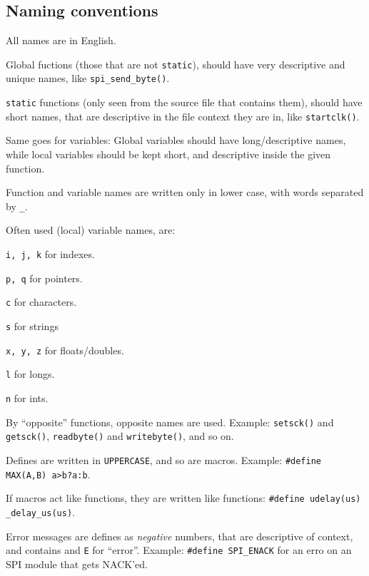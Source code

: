 \documentclass[article, 10pt]{memoir}
\let\tempone\itemize
\let\temptwo\enditemize
\renewenvironment{itemize}{\tempone\firmlist}{\temptwo}
\begin{document}
\begin{multicols}{2}
    \chapter{Naming conventions}
    \begin{itemize}
    \item All names are in English.
    \item Global fuctions (those that are not \texttt{static}), should have very descriptive and unique names, like \texttt{spi\_send\_byte()}.
    \item \texttt{static} functions (only seen from the source file that contains them), should have short names, that are descriptive in the file context they are in, like \texttt{startclk()}.
    \item Same goes for variables: Global variables should have long/descriptive names, while local variables should be kept short, and descriptive inside the given function.
    \item Function and variable names are written only in lower case, with words separated by \texttt{\_}.
    \item Often used (local) variable names, are:
        \begin{itemize}
        \item \texttt{i, j, k} for indexes.
        \item \texttt{p, q} for pointers.
        \item \texttt{c} for characters.
        \item \texttt{s} for strings
        \item \texttt{x, y, z} for floats/doubles.
        \item \texttt{l} for longs.
        \item \texttt{n} for ints.
        \end{itemize}
    \item By ``opposite'' functions, opposite names are used. Example: \texttt{setsck()} and \texttt{getsck()}, \texttt{readbyte()} and \texttt{writebyte()}, and so on.
    \item Defines are written in \texttt{UPPERCASE}, and so are macros. Example: \texttt{\#define MAX(A,B) a>b?a:b}. 

        If macros act like functions, they are written like functions: \texttt{\#define\ udelay(us) \_delay\_us(us)}.
    \item Error messages are defines as \emph{negative} numbers, that are descriptive of context, and contains and \texttt{E} for ``error''. Example: \texttt{\#define SPI\_ENACK} for an erro on an SPI module that gets NACK'ed.
    \end{itemize}


\end{multicols}
\end{document}
